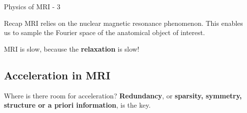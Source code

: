 \begin{frame}{Physics of MRI - 3}
    \begin{block}{Recap}
        MRI relies on the nuclear magnetic resonance phenomenon. This enables us to sample the Fourier space of the anatomical object of interest.
    \end{block}
    \pause
    MRI is slow, because the \textbf{relaxation} is slow!
\end{frame}

\subsection{Acceleration in MRI}
\begin{frame}{Where is there room for acceleration?}
    \textbf{Redundancy}, or \textbf{sparsity, symmetry, structure or a priori information}, is the key.\\
    
    
    

\end{frame}
